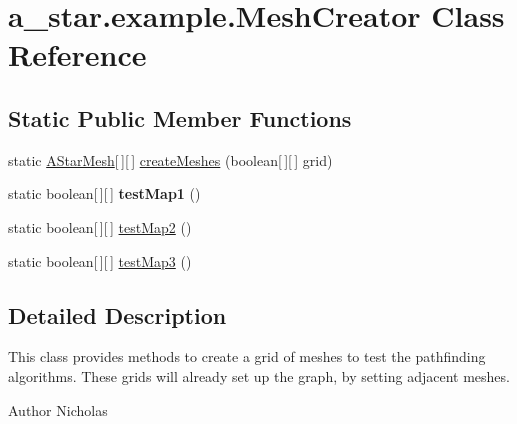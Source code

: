 \hypertarget{classa__star_1_1example_1_1_mesh_creator}{\section{a\-\_\-star.\-example.\-Mesh\-Creator Class Reference}
\label{classa__star_1_1example_1_1_mesh_creator}
}
\subsection*{Static Public Member Functions}
\begin{DoxyCompactItemize}
\item 
static \hyperlink{classa__star_1_1example_1_1_a_star_mesh}{A\-Star\-Mesh}\mbox{[}$\,$\mbox{]}\mbox{[}$\,$\mbox{]} \hyperlink{classa__star_1_1example_1_1_mesh_creator_a4e34278d5909159cad43e383c05d1057}{create\-Meshes} (boolean\mbox{[}$\,$\mbox{]}\mbox{[}$\,$\mbox{]} grid)
\item 
\hypertarget{classa__star_1_1example_1_1_mesh_creator_acd2e030759bffe8e4a02074fb2539809}{static boolean\mbox{[}$\,$\mbox{]}\mbox{[}$\,$\mbox{]} {\bfseries test\-Map1} ()}\label{classa__star_1_1example_1_1_mesh_creator_acd2e030759bffe8e4a02074fb2539809}

\item 
static boolean\mbox{[}$\,$\mbox{]}\mbox{[}$\,$\mbox{]} \hyperlink{classa__star_1_1example_1_1_mesh_creator_a6ed3493a725ac4ecb6f60c33023a9ad1}{test\-Map2} ()
\item 
static boolean\mbox{[}$\,$\mbox{]}\mbox{[}$\,$\mbox{]} \hyperlink{classa__star_1_1example_1_1_mesh_creator_a453963a690b84c9d50fe6a9ef8b64fab}{test\-Map3} ()
\end{DoxyCompactItemize}


\subsection{Detailed Description}
This class provides methods to create a grid of meshes to test the pathfinding algorithms. These grids will already set up the graph, by setting adjacent meshes.

\begin{DoxyAuthor}{Author}
Nicholas 
\end{DoxyAuthor}


